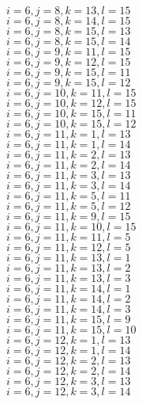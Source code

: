 \documentclass[14pt]{article}
\begin{document}
    $i=6,j=8,k=13,l=15 $ \\ 
    $i=6,j=8,k=14,l=15 $ \\ 
    $i=6,j=8,k=15,l=13 $ \\ 
    $i=6,j=8,k=15,l=14 $ \\ 
    $i=6,j=9,k=11,l=15 $ \\ 
    $i=6,j=9,k=12,l=15 $ \\ 
    $i=6,j=9,k=15,l=11 $ \\ 
    $i=6,j=9,k=15,l=12 $ \\ 
    $i=6,j=10,k=11,l=15 $ \\ 
    $i=6,j=10,k=12,l=15 $ \\ 
    $i=6,j=10,k=15,l=11 $ \\ 
    $i=6,j=10,k=15,l=12 $ \\ 
    $i=6,j=11,k=1,l=13 $ \\ 
    $i=6,j=11,k=1,l=14 $ \\ 
    $i=6,j=11,k=2,l=13 $ \\ 
    $i=6,j=11,k=2,l=14 $ \\ 
    $i=6,j=11,k=3,l=13 $ \\ 
    $i=6,j=11,k=3,l=14 $ \\ 
    $i=6,j=11,k=5,l=11 $ \\ 
    $i=6,j=11,k=5,l=12 $ \\ 
    $i=6,j=11,k=9,l=15 $ \\ 
    $i=6,j=11,k=10,l=15 $ \\ 
    $i=6,j=11,k=11,l=5 $ \\ 
    $i=6,j=11,k=12,l=5 $ \\ 
    $i=6,j=11,k=13,l=1 $ \\ 
    $i=6,j=11,k=13,l=2 $ \\ 
    $i=6,j=11,k=13,l=3 $ \\ 
    $i=6,j=11,k=14,l=1 $ \\ 
    $i=6,j=11,k=14,l=2 $ \\ 
    $i=6,j=11,k=14,l=3 $ \\ 
    $i=6,j=11,k=15,l=9 $ \\ 
    $i=6,j=11,k=15,l=10 $ \\ 
    $i=6,j=12,k=1,l=13 $ \\ 
    $i=6,j=12,k=1,l=14 $ \\ 
    $i=6,j=12,k=2,l=13 $ \\ 
    $i=6,j=12,k=2,l=14 $ \\ 
    $i=6,j=12,k=3,l=13 $ \\ 
    $i=6,j=12,k=3,l=14 $ \\ 
\end{document}
